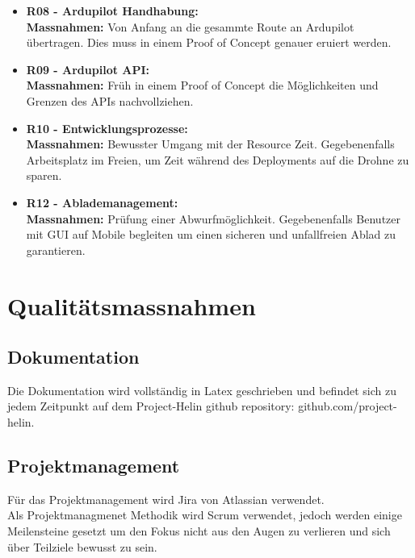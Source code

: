 \begin{itemize}
	\item{\textbf{R08 - Ardupilot Handhabung:} \\
	\textbf{Massnahmen:} Von Anfang an die gesammte Route an Ardupilot übertragen. Dies muss in einem Proof of Concept genauer eruiert werden.}
	
	\item{\textbf{R09 - Ardupilot API:} \\
	\textbf{Massnahmen:} Früh in einem Proof of Concept die Möglichkeiten und Grenzen des APIs nachvollziehen.}
	
	\item{\textbf{R10 - Entwicklungsprozesse:} \\
	\textbf{Massnahmen:} Bewusster Umgang mit der Resource Zeit. Gegebenenfalls Arbeitsplatz im Freien, um Zeit während des Deployments auf die Drohne zu sparen.}
	
	\item{\textbf{R12 - Ablademanagement:} \\
	\textbf{Massnahmen:} Prüfung einer Abwurfmöglichkeit. Gegebenenfalls Benutzer mit GUI auf Mobile begleiten um einen sicheren und unfallfreien Ablad zu garantieren.}
\end{itemize}

\section{Qualitätsmassnahmen}	
\subsection{Dokumentation}
Die Dokumentation wird vollständig in Latex geschrieben und befindet sich zu jedem Zeitpunkt auf dem Project-Helin github repository: github.com/project-helin.

\subsection{Projektmanagement}
Für das Projektmanagement wird Jira von Atlassian verwendet. \\
Als Projektmanagmenet Methodik wird Scrum verwendet, jedoch werden einige Meilensteine gesetzt um den Fokus nicht aus den Augen zu verlieren und sich über Teilziele bewusst zu sein.

